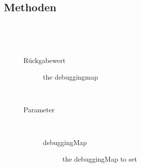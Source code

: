 \subsection{Methoden}
\begin{description}
\item[{\label{ontologyFramework.OFErrorManagement.DebuggingClassFlagData.getFlag(java.lang.String)}}]
~ 
\item[{\label{ontologyFramework.OFErrorManagement.DebuggingClassFlagData.getDebuggingMap()}}]
~ 
\begin{description}
\item[Rückgabewert] 
the debuggingmap
\end{description}
\item[{\label{ontologyFramework.OFErrorManagement.DebuggingClassFlagData.setDebuggingMap(java.util.Map<java.lang.String,java.lang.Boolean>)}}]
~ 
\begin{description}
\item[Parameter] ~
\begin{description}
\item[debuggingMap]
the debuggingMap to set
\end{description}
\end{description}
\item[{\label{ontologyFramework.OFErrorManagement.DebuggingClassFlagData.rebuild(ontologyFramework.OFContextManagement.OWLReferences)}}]
~ 
\end{description}
